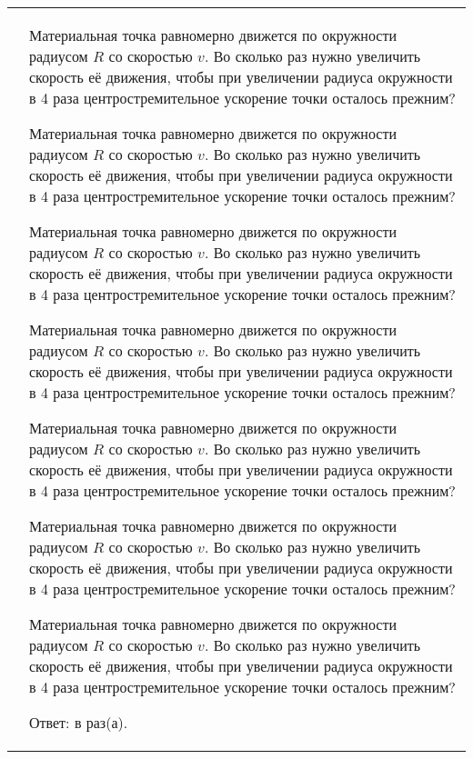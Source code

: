 \documentclass[10pt,a4paper,twocolumn,landscape]{article}
\begin{document}
\hspace{-0.25cm}

\vspace{1cm}

\hspace{-1.5cm}
\begin{tabular}{c l}
	\framebox[0.85cm]{\textbf{1}}\hspace{-0.15cm} &
	\begin{minipage}[t]{11.25cm}
		Материальная точка равномерно движется по окружности радиусом $R$
		со скоростью $v$. Во сколько раз нужно увеличить скорость её движения,
		чтобы при увеличении радиуса окружности в 4 раза центростремительное
		ускорение точки осталось прежним?

		Материальная точка равномерно движется по окружности радиусом $R$
		со скоростью $v$. Во сколько раз нужно увеличить скорость её движения,
		чтобы при увеличении радиуса окружности в 4 раза центростремительное
		ускорение точки осталось прежним?

		Материальная точка равномерно движется по окружности радиусом $R$
		со скоростью $v$. Во сколько раз нужно увеличить скорость её движения,
		чтобы при увеличении радиуса окружности в 4 раза центростремительное
		ускорение точки осталось прежним?

		Материальная точка равномерно движется по окружности радиусом $R$
		со скоростью $v$. Во сколько раз нужно увеличить скорость её движения,
		чтобы при увеличении радиуса окружности в 4 раза центростремительное
		ускорение точки осталось прежним?

		Материальная точка равномерно движется по окружности радиусом $R$
		со скоростью $v$. Во сколько раз нужно увеличить скорость её движения,
		чтобы при увеличении радиуса окружности в 4 раза центростремительное
		ускорение точки осталось прежним?

		Материальная точка равномерно движется по окружности радиусом $R$
		со скоростью $v$. Во сколько раз нужно увеличить скорость её движения,
		чтобы при увеличении радиуса окружности в 4 раза центростремительное
		ускорение точки осталось прежним?
		
		Материальная точка равномерно движется по окружности радиусом $R$
		со скоростью $v$. Во сколько раз нужно увеличить скорость её движения,
		чтобы при увеличении радиуса окружности в 4 раза центростремительное
		ускорение точки осталось прежним?

		\vspace{1em}Ответ: в \underline{\hspace{4.5cm}} раз(а).
	\end{minipage}
\end{tabular}
\end{document}
